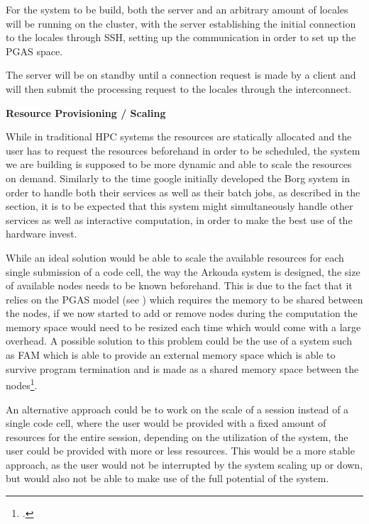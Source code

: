 For the system to be build, both the server and an arbitrary amount of locales will be running on the cluster,
with the server establishing the initial connection to the locales through \ac{SSH}, setting up
the communication in order to set up the \ac{PGAS} space.

The server will be on standby until a connection request is made by a client and will then submit the
processing request to the locales through the interconnect.

\textbf{Resource Provisioning / Scaling}
\label{asp:resource_provisioning}

While in traditional \ac{HPC} systems the resources are statically allocated and the user has to request the resources beforehand in order to be scheduled,
the system we are building is supposed to be more dynamic and able to scale the resources on demand.
Similarly to the time google initially developed the Borg system in order to handle both their services as
well as their batch jobs, as described in the  section, it is to be expected
that this system  might simultaneously handle other services as well as interactive computation,
in order to make the best use of the hardware invest.

While an ideal solution would be able to scale the available resources for each single submission of a code cell,
the way the Arkouda system is designed, the size of available nodes needs to be known beforehand.
This is due to the fact that it relies on the \ac{PGAS} model (see ) which requires
the memory to be shared between the nodes, if we now started to add or remove nodes during the computation
the memory space would need to be resized each time which would come with a large overhead.
A possible solution to this problem could be the use of a system such as \ac{FAM} which is able to provide an external memory space
which is able to survive program termination and is made as a shared memory space between the nodes\footcite{keetonOpenFAMAPIProgramming2019a}.

An alternative approach could be to work on the scale of a session instead of a single code cell,
where the user would be provided with a fixed amount of resources for the entire session,
depending on the utilization of the system, the user could be provided with more or less resources.
This would be a more stable approach, as the user would not be interrupted by the system scaling up or down,
but would also not be able to make use of the full potential of the system.

